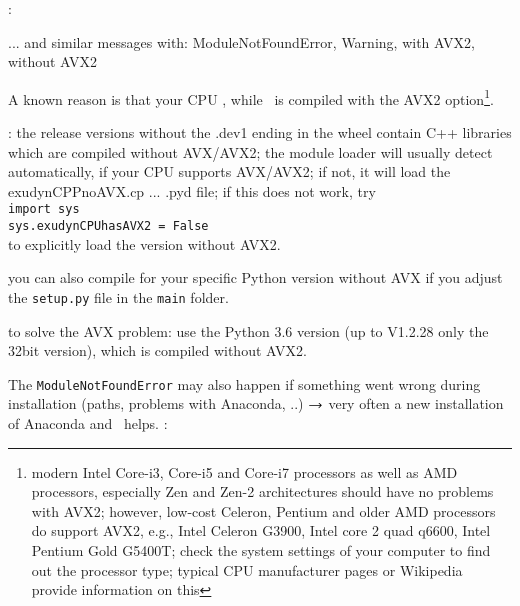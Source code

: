 \ei
\item {}:\\
\bi
\item[$\ra$] ... and similar messages with: ModuleNotFoundError, Warning, with AVX2, without AVX2
\item[$\ra$] A known reason is that your CPU , while \codeName\ is compiled with the AVX2 option\footnote{modern Intel Core-i3, Core-i5 and Core-i7 processors as well as AMD processors, especially Zen and Zen-2 architectures should have no problems with AVX2; however, low-cost Celeron, Pentium and older AMD processors do  support AVX2, e.g.,  Intel Celeron G3900, Intel core 2 quad q6600, Intel Pentium Gold G5400T; check the system settings of your computer to find out the processor type; typical CPU manufacturer pages or Wikipedia provide information on this}.
\item[$\ra$] : the release versions without the .dev1 ending in the wheel contain C++ libraries which are compiled without AVX/AVX2; the module loader will usually detect automatically, if your CPU supports AVX/AVX2; if not, it will load the 
exudynCPPnoAVX.cp ... .pyd file; if this does not work, try\\
\texttt{import sys}\\
\texttt{sys.exudynCPUhasAVX2 = False}\\
to explicitly load the version without AVX2.
\item[$\ra$] you can also compile for your specific Python version without AVX if you adjust the \texttt{setup.py} file in the \texttt{main} folder.
\item[$\ra$]  to solve the AVX problem: use the Python 3.6 version (up to \codeName V1.2.28 only the 32bit version), which is compiled without AVX2.
\item[$\ra$] The \texttt{ModuleNotFoundError} may also happen if something went wrong during installation (paths, problems with Anaconda, ..) $\ra$ very often a new installation of Anaconda and \codeName\ helps.
\ei
\ei
\noindent {}:
\bi
